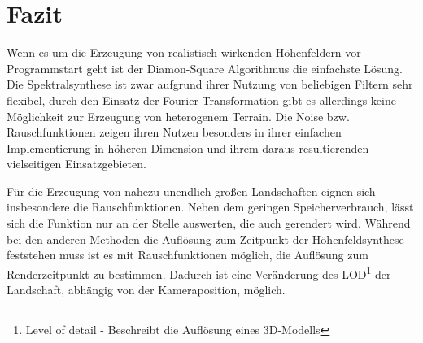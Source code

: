 \chapter{Fazit}
Wenn es um die Erzeugung von realistisch wirkenden Höhenfeldern vor Programmstart geht ist der Diamon-Square Algorithmus die einfachste Lösung. Die Spektralsynthese ist zwar aufgrund ihrer Nutzung von beliebigen Filtern sehr flexibel, durch den Einsatz der Fourier Transformation gibt es allerdings keine Möglichkeit zur Erzeugung von heterogenem Terrain. Die Noise bzw. Rauschfunktionen zeigen ihren Nutzen besonders in ihrer einfachen Implementierung in höheren Dimension und ihrem daraus resultierenden vielseitigen Einsatzgebieten.

Für die Erzeugung von nahezu unendlich großen Landschaften eignen sich insbesondere die Rauschfunktionen. Neben dem geringen Speicherverbrauch, lässt sich die Funktion nur an der Stelle auswerten, die auch gerendert wird. Während bei den anderen Methoden die Auflösung zum Zeitpunkt der Höhenfeldsynthese feststehen muss ist es mit Rauschfunktionen möglich, die Auflösung zum Renderzeitpunkt zu bestimmen. Dadurch ist eine Veränderung des LOD\footnote{Level of detail - Beschreibt die Auflösung eines 3D-Modells} der Landschaft, abhängig von der Kameraposition, möglich.